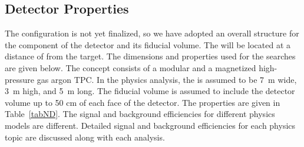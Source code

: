 \begin{table}[h]
    \begin{center}
        \end{center}
        \caption{\label{tabBC} Beam Power Configurations used for ND and FD.}
    \end{table} 

\subsection{Detector Properties}
\label{sec:ndprops}

The  configuration is not yet finalized, so we have adopted an overall structure for the  component of the detector and its fiducial volume. %
The  will be located at a distance of \ndfromtarget from the target. The  dimensions and properties used for the  searches are given below.
The  concept %
consists of a modular \lartpc and a magnetized high-pressure gas argon TPC. In the  physics analysis, %
the  is assumed to be \SI{7}{m} wide, \SI{3}{m} high, and \SI{5}{m} long. The fiducial volume is assumed to include the detector volume up to 50 cm of each face of the detector.
The  properties are given in Table~\ref{tabND}. The signal and background efficiencies for different physics models are different. %
Detailed signal and background efficiencies for each physics topic are discussed along with each analysis.

